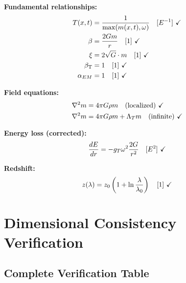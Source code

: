 \documentclass[12pt,a4paper]{article}
\newcommand{\betaT}{\beta_{\text{T}}}
\begin{document}
	\begin{tcolorbox}[colback=green!5!white,colframe=green!75!black,title=T0 Model Parameters (All Dimensionally Consistent)]
		
		\textbf{Fundamental relationships:}
		\begin{align}
			T(x,t) &= \frac{1}{\max(m(x,t), \omega)} \quad [E^{-1}] \text{ \checkmark} \\
			\beta &= \frac{2Gm}{r} \quad [1] \text{ \checkmark} \\
			\xi &= 2\sqrt{G} \cdot m \quad [1] \text{ \checkmark} \\
			\betaT &= 1 \quad [1] \text{ \checkmark} \\
			\alpha_{EM} &= 1 \quad [1] \text{ \checkmark}
		\end{align}
		
		\textbf{Field equations:}
		\begin{align}
			\nabla^2 m &= 4\pi G \rho m \quad \text{(localized)} \text{ \checkmark} \\
			\nabla^2 m &= 4\pi G \rho m + \Lambda_T m \quad \text{(infinite)} \text{ \checkmark}
		\end{align}
		
		\textbf{Energy loss (corrected):}
		\begin{equation}
			\frac{dE}{dr} = -g_T \omega^2 \frac{2G}{r^2} \quad [E^2] \text{ \checkmark}
		\end{equation}
		
		\textbf{Redshift:}
		\begin{equation}
			z(\lambda) = z_0\left(1 + \ln\frac{\lambda}{\lambda_0}\right) \quad [1] \text{ \checkmark}
		\end{equation}
		
	\end{tcolorbox}
	
	\section{Dimensional Consistency Verification}
	\label{sec:dimensional_verification}
	
	\subsection{Complete Verification Table}
	
\end{document}
